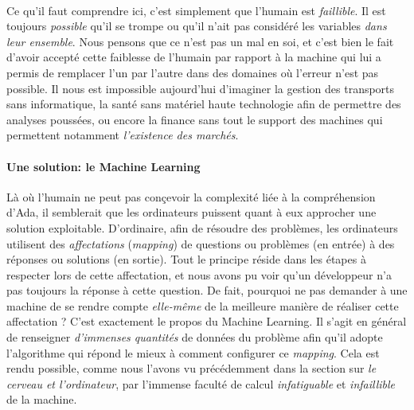 \paragraph{} Ce qu'il faut comprendre ici, c'est simplement que l'humain est \emph{faillible}. Il est toujours \emph{possible} qu'il se trompe
ou qu'il n'ait pas considéré les variables \emph{dans leur ensemble}. Nous pensons que ce n'est pas un mal en soi, et c'est bien le fait d'avoir accepté cette
faiblesse de l'humain par rapport à la machine qui lui a permis de remplacer l'un par l'autre dans des domaines où l'erreur n'est pas possible.
Il nous est impossible aujourd'hui d'imaginer la gestion des transports sans informatique, la santé sans matériel haute technologie afin de
permettre des analyses poussées, ou encore la finance sans tout le support des machines qui permettent notamment \emph{l'existence des marchés}. 

\paragraph{Une solution: le Machine Learning} Là où l'humain ne peut pas conçevoir la complexité liée à la compréhension d'Ada, il semblerait que les
ordinateurs puissent quant à eux approcher une solution exploitable. D'ordinaire, afin de résoudre des problèmes, les ordinateurs utilisent des \emph{affectations}
(\emph{mapping}) de questions ou problèmes (en entrée) à des réponses ou solutions (en sortie). Tout le principe réside dans les étapes à respecter lors de
cette affectation, et nous avons pu voir qu'un développeur n'a pas toujours la réponse à cette question. De fait, pourquoi ne pas demander à une 
machine de se rendre compte \emph{elle-même} de la meilleure manière de réaliser cette affectation ? \cite{MachineLearning0} C'est exactement le propos du Machine
Learning. Il s'agit en général de renseigner \emph{d'immenses quantités} de données du problème afin qu'il adopte l'algorithme qui répond le mieux à
comment configurer ce \emph{mapping}. Cela est rendu possible, comme nous l'avons vu précédemment dans la section sur \emph{le cerveau et l'ordinateur},
par l'immense faculté de calcul \emph{infatiguable} et \emph{infaillible} de la machine.

